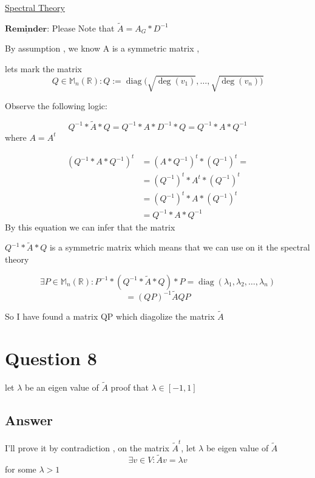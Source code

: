 \documentclass[9pt,twocolumn]{article}
\DeclareMathOperator{\diag}{diag}
\theoremstyle{definition}
\begin{document}
\href{https://en.wikipedia.org/wiki/Spectral\_theory}{Spectral Theory}

\begin{math}
\underline{\textbf{Reminder:}}
\end{math}
Please Note that \(\tilde{A}=A_G*D^{-1}\)

By assumption , we know A is a symmetric matrix ,

lets mark the matrix
\[ Q\in \mathbb{M}_n(\mathbb{R}) : Q := \diag(\sqrt{ \deg(v_1) },\dots , \sqrt{ \deg(v_n)) } \]

Observe the following logic:

\[
Q^{-1}*\tilde{A}*Q=Q^{-1}*A*D^{-1}*Q=Q^{-1}*A*Q^{-1}
\]
where \(A=A^{t}\)

\begin{align*}
(Q^{-1}*A*Q^{-1})^{t}&=(A*Q^{-1})^t*(Q^{-1})^t= \\
                    &=(Q^{-1})^t*A^t*(Q^{-1})^t \\
                    &=(Q^{-1})^t*A*(Q^{-1})^t \\
                    &=Q^{-1}*A*Q^{-1}
\end{align*}
By this equation we can infer that the matrix

\(Q^{-1}*\tilde{A}*Q\) is
a symmetric matrix which means that we can use on it the spectral theory

\[
\exists P\in \mathbb{M}_n(\mathbb{R}) : P^{-1}*(Q^{-1}*\tilde{A}*Q)*P = \diag(\lambda _1 , \lambda _2 , \dots , \lambda _n)
\]
\[
=(QP)^{-1}\tilde{A}QP
\]

So I have found a matrix QP which diagolize the matrix \(\tilde{A}\)






\section*{Question 8}
\label{sec:org661e71c}

let \(\lambda\) be an eigen value of \(\tilde{A}\) proof that
\(\lambda\in [-1,1]\)

\subsection*{Answer}
\label{sec:org104feee}
I'll prove it by contradiction , on the matrix \(\tilde{A}^t\), let \(\lambda\) be eigen value of \(\tilde{A}\)
\[\exists v\in V : \tilde{A}v=\lambda v\]
for some \(\lambda > 1\)
\end{document}
